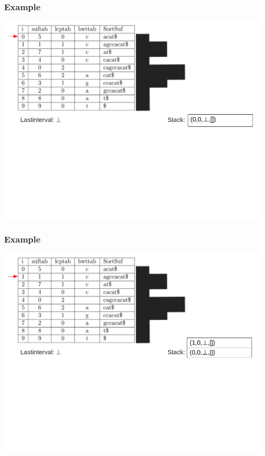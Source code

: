 \documentclass[compress,handout]{beamer} %
\begin{document}
\begin{frame}
	\frametitle{Example}
	\includegraphics[width=\textwidth, height=\textheight, keepaspectratio=true]{traversal_1}
\end{frame}

\begin{frame}
	\frametitle{Example}
	\includegraphics[width=\textwidth, height=\textheight, keepaspectratio=true]{traversal_2}
\end{frame}
\end{document}
